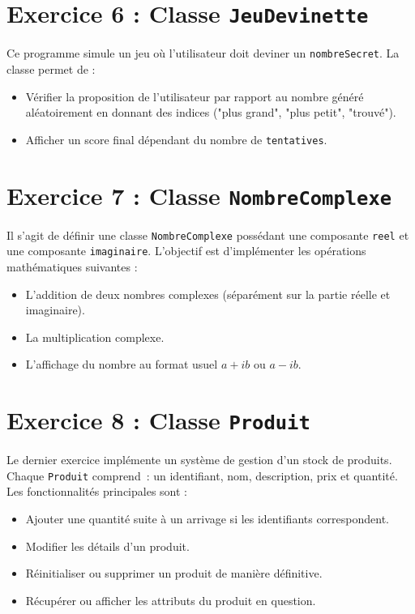 

\section{Exercice 6 : Classe \texttt{JeuDevinette}}
Ce programme simule un jeu o\`{u} l'utilisateur doit deviner un \texttt{nombreSecret}. La classe permet de :
\begin{itemize}
    \item V\'{e}rifier la proposition de l'utilisateur par rapport au nombre g\'{e}n\'{e}r\'{e} al\'{e}atoirement en donnant des indices ("plus grand", "plus petit", "trouv\'{e}").
    \item Afficher un score final d\'{e}pendant du nombre de \texttt{tentatives}.
\end{itemize}



\section{Exercice 7 : Classe \texttt{NombreComplexe}}
Il s'agit de d\'{e}finir une classe \texttt{NombreComplexe} poss\'{e}dant une composante \texttt{reel} et une composante \texttt{imaginaire}. L'objectif est d'impl\'{e}menter les op\'{e}rations math\'{e}matiques suivantes :
\begin{itemize}
    \item L'addition de deux nombres complexes (s\'{e}par\'{e}ment sur la partie r\'{e}elle et imaginaire).
    \item La multiplication complexe.
    \item L'affichage du nombre au format usuel $a + ib$ ou $a - ib$.
\end{itemize}



\section{Exercice 8 : Classe \texttt{Produit}}
Le dernier exercice impl\'{e}mente un syst\`{e}me de gestion d'un stock de produits. Chaque \texttt{Produit} comprend~: un identifiant, nom, description, prix et quantit\'{e}. Les fonctionnalit\'{e}s principales sont :
\begin{itemize}
    \item Ajouter une quantit\'{e} suite \`{a} un arrivage si les identifiants correspondent.
    \item Modifier les d\'{e}tails d'un produit.
    \item R\'{e}initialiser ou supprimer un produit de mani\`{e}re d\'{e}finitive.
    \item R\'{e}cup\'{e}rer ou afficher les attributs du produit en question.
\end{itemize}


